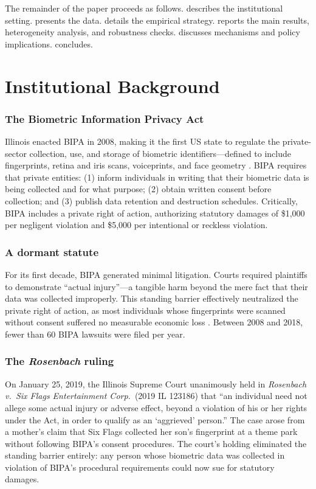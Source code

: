 \documentclass[12pt]{article}
\begin{document}
The remainder of the paper proceeds as follows.  describes the institutional setting.  presents the data.  details the empirical strategy.  reports the main results, heterogeneity analysis, and robustness checks.  discusses mechanisms and policy implications.  concludes.

\section{Institutional Background}
\label{sec:background}

\subsubsection*{The Biometric Information Privacy Act} Illinois enacted BIPA in 2008, making it the first US state to regulate the private-sector collection, use, and storage of biometric identifiers---defined to include fingerprints, retina and iris scans, voiceprints, and face geometry \citep{solovehoofnagle2006}. BIPA requires that private entities: (1) inform individuals in writing that their biometric data is being collected and for what purpose; (2) obtain written consent before collection; and (3) publish data retention and destruction schedules. Critically, BIPA includes a private right of action, authorizing statutory damages of \$1,000 per negligent violation and \$5,000 per intentional or reckless violation.

\subsubsection*{A dormant statute} For its first decade, BIPA generated minimal litigation. Courts required plaintiffs to demonstrate ``actual injury''---a tangible harm beyond the mere fact that their data was collected improperly. This standing barrier effectively neutralized the private right of action, as most individuals whose fingerprints were scanned without consent suffered no measurable economic loss \citep{tucker2019}. Between 2008 and 2018, fewer than 60 BIPA lawsuits were filed per year.

\subsubsection*{The \emph{Rosenbach} ruling} On January 25, 2019, the Illinois Supreme Court unanimously held in \emph{Rosenbach v.\ Six Flags Entertainment Corp.}\ (2019 IL 123186) that ``an individual need not allege some actual injury or adverse effect, beyond a violation of his or her rights under the Act, in order to qualify as an `aggrieved' person.'' The case arose from a mother's claim that Six Flags collected her son's fingerprint at a theme park without following BIPA's consent procedures. The court's holding eliminated the standing barrier entirely: any person whose biometric data was collected in violation of BIPA's procedural requirements could now sue for statutory damages.
\end{document}
